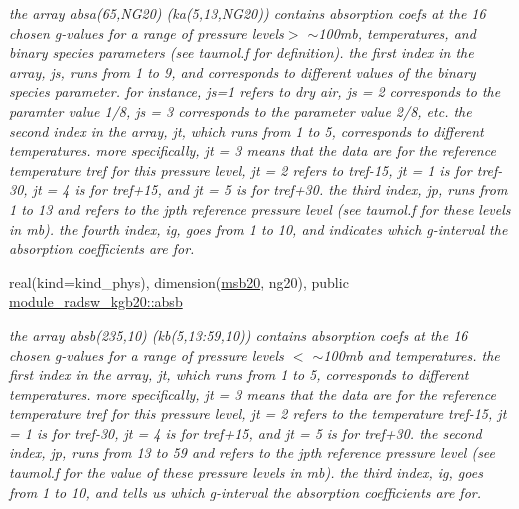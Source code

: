 \begin{DoxyCompactItemize}
\begin{DoxyCompactList}\small\item\em the array absa(65,\+N\+G20) (ka(5,13,\+N\+G20)) contains absorption coefs at the 16 chosen g-\/values for a range of pressure levels$>$ $\sim$100mb, temperatures, and binary species parameters (see taumol.\+f for definition). the first index in the array, js, runs from 1 to 9, and corresponds to different values of the binary species parameter. for instance, js=1 refers to dry air, js = 2 corresponds to the paramter value 1/8, js = 3 corresponds to the parameter value 2/8, etc. the second index in the array, jt, which runs from 1 to 5, corresponds to different temperatures. more specifically, jt = 3 means that the data are for the reference temperature tref for this pressure level, jt = 2 refers to tref-\/15, jt = 1 is for tref-\/30, jt = 4 is for tref+15, and jt = 5 is for tref+30. the third index, jp, runs from 1 to 13 and refers to the jpth reference pressure level (see taumol.\+f for these levels in mb). the fourth index, ig, goes from 1 to 10, and indicates which g-\/interval the absorption coefficients are for. \end{DoxyCompactList}\item 
\mbox{\label{group__module__radsw__kgbnn_gaf5b135f82f34831e86a12f726cbe47ad}} 
real(kind=kind\+\_\+phys), dimension(\hyperlink{group__module__radsw__kgbnn_ga385f5b8c61ed1de7aa3bbb6bd65f522f}{msb20}, ng20), public \hyperlink{group__module__radsw__kgbnn_gaf5b135f82f34831e86a12f726cbe47ad}{module\+\_\+radsw\+\_\+kgb20\+::absb}
\begin{DoxyCompactList}\small\item\em the array absb(235,10) (kb(5,13\+:59,10)) contains absorption coefs at the 16 chosen g-\/values for a range of pressure levels $<$ $\sim$100mb and temperatures. the first index in the array, jt, which runs from 1 to 5, corresponds to different temperatures. more specifically, jt = 3 means that the data are for the reference temperature tref for this pressure level, jt = 2 refers to the temperature tref-\/15, jt = 1 is for tref-\/30, jt = 4 is for tref+15, and jt = 5 is for tref+30. the second index, jp, runs from 13 to 59 and refers to the jpth reference pressure level (see taumol.\+f for the value of these pressure levels in mb). the third index, ig, goes from 1 to 10, and tells us which g-\/interval the absorption coefficients are for. \end{DoxyCompactList}\item 

\end{DoxyCompactItemize}
